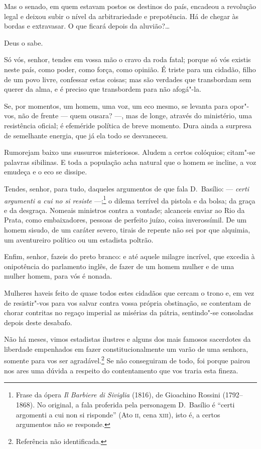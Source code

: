 Mas o senado, em quem estavam postos os destinos do país, encadeou a
revolução legal e deixou subir o nível da arbitrariedade e prepotência.
Há de chegar às bordas e extravasar. O que ficará depois da aluvião?\ldots

 Deus o sabe. 

 Só vós, senhor, tendes em vossa mão o cravo da roda fatal; porque só
vós existis neste país, como poder, como força, como opinião. É triste
para um cidadão, filho de um povo livre, confessar estas coisas; mas
são verdades que transbordam sem querer da alma, e é preciso que
transbordem para não afogá"-la. 

 Se, por momentos, um homem, uma voz, um eco mesmo, se levanta para
opor"-vos, não de frente --- quem ousara? ---, mas de longe, através do
ministério, uma resistência oficial; é efeméride política de breve
momento. Dura ainda a surpresa de semelhante energia, que já ela todo
se desvaneceu. 

 Rumorejam baixo uns sussurros misteriosos. Aludem a certos colóquios;
citam"-se palavras sibilinas. E toda a população acha natural que o
homem se incline, a voz emudeça e o eco se dissipe. 

 Tendes, senhor, para tudo, daqueles argumentos de que fala D.~Basílio:
--- \textit{certi argumenti a cui no si resiste} ---;\footnote{ Frase da ópera 
\textit{Il Barbiere di Siviglia} (1816), de Gioachino Rossini
(1792--1868). No original, a fala proferida pela personagem D.~Basílio
é ``certi argomenti a cui non si risponde'' (Ato \textsc{ii}, cena \textsc{xiii}), isto é, a
certos argumentos não se responde.}
 o dilema terrível da pistola e da bolsa; da graça e da desgraça.
Nomeais ministros contra a vontade; alcanceis enviar ao Rio da Prata,
como embaixadores, pessoas de perfeito juízo, coisa inverossímil. De um
homem sisudo, de um caráter severo, tirais de repente não sei por que
alquimia, um aventureiro político ou um estadista poltrão. 

 Enfim, senhor, fazeis do preto branco: e até aquele milagre incrível,
que excedia à onipotência do parlamento inglês, de fazer de um homem
mulher e de uma mulher homem, para vós é nonada.

 Mulheres haveis feito de quase todos estes cidadãos que cercam o trono
e, em vez de resistir"-vos para vos salvar contra vossa própria
obstinação, se contentam de chorar contritas no regaço imperial as
misérias da pátria, sentindo"-se consoladas depois deste desabafo.  

  Não há meses, vimos estadistas ilustres e alguns dos mais famosos
sacerdotes da liberdade empenhados em fazer constitucionalmente um
varão de uma senhora, somente para vos ser
agradável.\footnote{ Referência não identificada.}
 Se não conseguiram de todo, foi porque pairou nos ares uma dúvida a
respeito do contentamento que vos traria esta fineza. 

